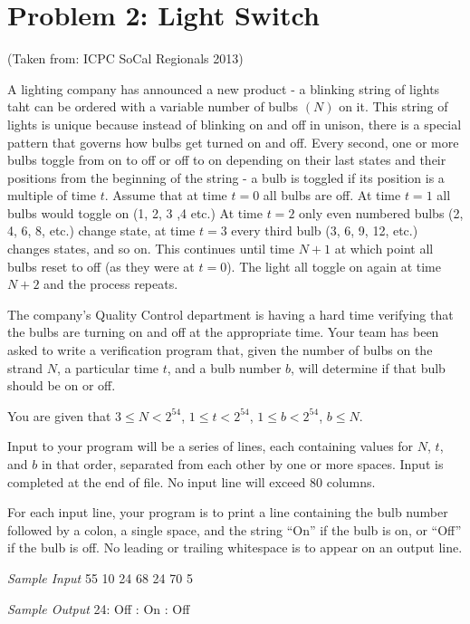 \normalfont\documentclass[letterpaper,11pt]{article}
\begin{document}
\newpage

\section*{Problem 2: Light Switch}
(Taken from: ICPC SoCal Regionals 2013)

A lighting company has announced a new product - a blinking string of lights taht can be ordered with a variable number of bulbs $(N)$ on it. This string of lights is unique because instead of blinking on and off in unison, there is a special pattern that governs how bulbs get turned on and off. Every second, one or more bulbs toggle from on to off or off to on depending on their last states and their positions from the beginning of the string - a bulb is toggled if its position is a multiple of time $t$. Assume that at time $t = 0$ all bulbs are off. At time $t = 1$ all bulbs would toggle on (1, 2, 3 ,4 etc.) At time $t = 2$ only even numbered bulbs (2, 4, 6, 8, etc.) change state, at time $t = 3$ every third bulb (3, 6, 9, 12, etc.) changes states, and so on. This continues until time $N + 1$ at which point all bulbs reset to off (as they were at $t = 0$). The light all toggle on again at time $N + 2$ and the process repeats.

The company's Quality Control department is having a hard time verifying that the bulbs are turning on and off at the appropriate time. Your team has been asked to write a verification program that, given the number of bulbs on the strand $N$, a particular time $t$, and a bulb number $b$, will determine if that bulb should be on or off.

You are given that $3 \leq N < 2^{54}$, $1 \leq t < 2^{54}$, $1 \leq b < 2^{54}$, $b \leq N$.

Input to your program will be a series of lines, each containing values for $N$, $t$, and $b$ in that order, separated from each other by one or more spaces. Input is completed at the end of file. No input line will exceed 80 columns.

For each input line, your program is to print a line containing the bulb number followed by a colon, a single space, and the string ``On'' if the bulb is on, or ``Off'' if the bulb is off. No leading or trailing whitespace is to appear on an output line.

\textit{Sample Input}
55 10 24  68 24  70 5

\textit{Sample Output}
24: Off : On : Off
\end{document}
